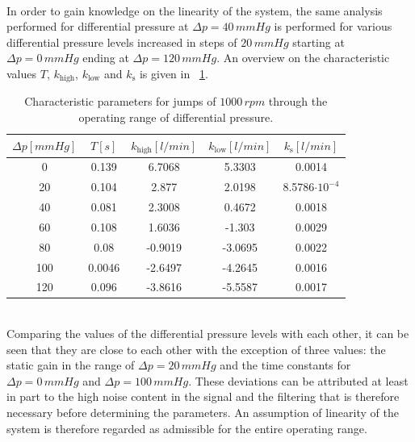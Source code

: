 \\In order to gain knowledge on the linearity of the system, the same analysis performed for differential pressure at $\Delta{p}=40\,mmHg$ is performed for various differential pressure levels increased in steps of $20\,mmHg$ starting at $\Delta{p}=0\,mmHg$ ending at $\Delta{p}=120\,mmHg$. An overview on the characteristic values $T$, $k_{\mathrm{high}}$, $k_{\mathrm{low}}$ and $k_{\mathrm{s}}$ is given in \tablename~\ref{tab:linearity}.
\begin{table}[h]
  \centering
  \begin{tabular}{c|c|c|c|c}
    \toprule
    $\Delta{p} [mmHg]$  & $T [s]$ & $k_{\mathrm{high}} [l/min]$ & $k_{\mathrm{low}} [l/min]$ & $k_{\mathrm{s}} [l/min]$\\
    \midrule
    0 & 0.139 & 6.7068 & 5.3303 & 0.0014\\
    20 & 0.104 & 2.877 & 2.0198 & 8.5786$\cdot10^{-4}$\\
    40 &  0.081 & 2.3008 & 0.4672 & 0.0018\\
    60 & 0.108 & 1.6036 & -1.303 & 0.0029\\
    80 & 0.08 & -0.9019 & -3.0695 & 0.0022\\
    100 & 0.0046 & -2.6497 & -4.2645 & 0.0016\\
    120 & 0.096 & -3.8616 & -5.5587 & 0.0017\\
    \bottomrule
  \end{tabular}
  \caption[Characteristic parameters for jumps of $1000\,rpm$ through the operating range of differential pressure.]{Characteristic parameters for jumps of $1000\,rpm$ through the operating range of differential pressure.}
\label{tab:linearity}
\end{table}
\\Comparing the values of the differential pressure levels with each other, it can be seen that they are close to each other with the exception of three values: the static gain in the range of $\Delta{p}=20\,mmHg$ and the time constants for $\Delta{p}=0\,mmHg$ and $\Delta{p}=100\,mmHg$. These deviations can be attributed at least in part to the high noise content in the signal and the filtering that is therefore necessary before determining the parameters. An assumption of linearity of the system is therefore regarded as admissible for the entire operating range.
